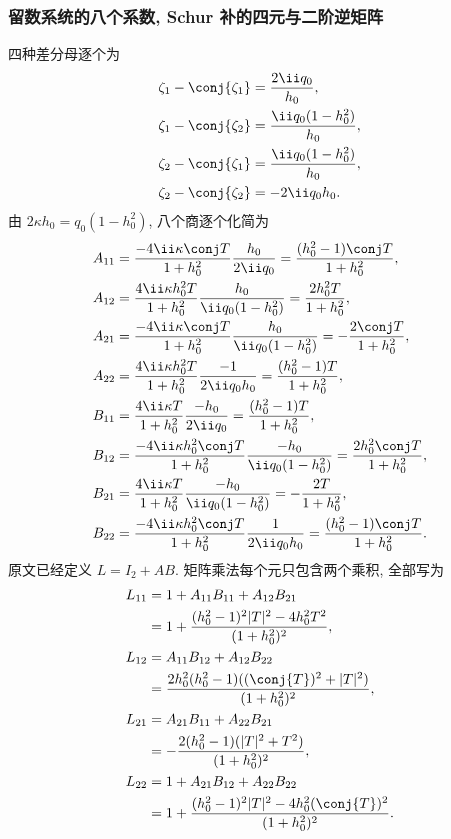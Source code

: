 \subsubsection*{留数系统的八个系数, Schur 补的四元与二阶逆矩阵}
四种差分母逐个为
\[
\begin{aligned}
\zeta_1-\conj{\zeta_1}&=\dfrac{2\ii q_0}{h_0},\\
\zeta_1-\conj{\zeta_2}&=\dfrac{\ii q_0(1-h_0^2)}{h_0},\\
\zeta_2-\conj{\zeta_1}&=\dfrac{\ii q_0(1-h_0^2)}{h_0},\\
\zeta_2-\conj{\zeta_2}&=-2\ii q_0h_0.
\end{aligned}
\]
由 $2\kappa h_0=q_0(1-h_0^2)$, 八个商逐个化简为
\[
\begin{aligned}
 A_{11}
&=\dfrac{-4\ii\kappa\conj T}{1+h_0^2}
\dfrac{h_0}{2\ii q_0}
=\dfrac{(h_0^2-1)\conj T}{1+h_0^2},\\
 A_{12}
&=\dfrac{4\ii\kappa h_0^2T}{1+h_0^2}
\dfrac{h_0}{\ii q_0(1-h_0^2)}
=\dfrac{2h_0^2T}{1+h_0^2},\\
 A_{21}
&=\dfrac{-4\ii\kappa\conj T}{1+h_0^2}
\dfrac{h_0}{\ii q_0(1-h_0^2)}
=-\dfrac{2\conj T}{1+h_0^2},\\
 A_{22}
&=\dfrac{4\ii\kappa h_0^2T}{1+h_0^2}
\dfrac{-1}{2\ii q_0h_0}
=\dfrac{(h_0^2-1)T}{1+h_0^2},\\
 B_{11}
&=\dfrac{4\ii\kappa T}{1+h_0^2}
\dfrac{-h_0}{2\ii q_0}
=\dfrac{(h_0^2-1)T}{1+h_0^2},\\
 B_{12}
&=\dfrac{-4\ii\kappa h_0^2\conj T}{1+h_0^2}
\dfrac{-h_0}{\ii q_0(1-h_0^2)}
=\dfrac{2h_0^2\conj T}{1+h_0^2},\\
 B_{21}
&=\dfrac{4\ii\kappa T}{1+h_0^2}
\dfrac{-h_0}{\ii q_0(1-h_0^2)}
=-\dfrac{2T}{1+h_0^2},\\
 B_{22}
&=\dfrac{-4\ii\kappa h_0^2\conj T}{1+h_0^2}
\dfrac{1}{2\ii q_0h_0}
=\dfrac{(h_0^2-1)\conj T}{1+h_0^2}.
\end{aligned}
\]
原文已经定义 $L=I_2+ A B$.
矩阵乘法每个元只包含两个乘积, 全部写为
\[
\begin{aligned}
L_{11}
&=1+ A_{11} B_{11}
+ A_{12} B_{21}\\
&=1+\dfrac{(h_0^2-1)^2|T|^2-4h_0^2T^2}
{(1+h_0^2)^2},\\
L_{12}
&= A_{11} B_{12}
+ A_{12} B_{22}\\
&=\dfrac{2h_0^2(h_0^2-1)((\conj{T})^2+|T|^2)}
{(1+h_0^2)^2},\\
L_{21}
&= A_{21} B_{11}
+ A_{22} B_{21}\\
&=-\dfrac{2(h_0^2-1)(|T|^2+T^2)}
{(1+h_0^2)^2},\\
L_{22}
&=1+ A_{21} B_{12}
+ A_{22} B_{22}\\
&=1+\dfrac{(h_0^2-1)^2|T|^2-4h_0^2(\conj{T})^2}
{(1+h_0^2)^2}.
\end{aligned}
\]
